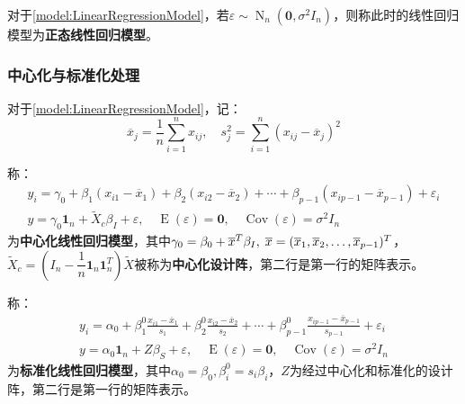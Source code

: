 \begin{definition}\label{model:NormalLinearRegressionModel}
	对于\cref{model:LinearRegressionModel}，若$\varepsilon\sim\operatorname{N}_n(\mathbf{0},\sigma^2I_n)$，则称此时的线性回归模型为\textbf{正态线性回归模型}。
\end{definition}
\subsubsection{中心化与标准化处理}
\begin{definition}\label{model:CentralizedStandardizedLinearModel}
	对于\cref{model:LinearRegressionModel}，记：
	\begin{equation*}
		\overline{x}_j=\frac{1}{n}\sum_{i=1}^{n}x_{ij},\quad s_j^2=\sum_{i=1}^{n}(x_{ij}-\overline{x}_j)^2
	\end{equation*}\par
	称：
	\begin{gather*}
		y_i=\gamma_0+\beta_1(x_{i1}-\overline{x}_1)+\beta_2(x_{i2}-\overline{x}_2)+\cdots+\beta_{p-1}(x_{ip-1}-\overline{x}_{p-1})+\varepsilon_i \\
		y=\gamma_0\mathbf{1}_n+\tilde{X}_c\beta_I+\varepsilon,\quad\operatorname{E}(\varepsilon)=\mathbf{0},\quad\operatorname{Cov}(\varepsilon)=\sigma^2I_n
	\end{gather*}
	为\textbf{中心化线性回归模型}，其中$\gamma_0=\beta_0+\overline{x}^T\beta_I,\;\overline{x}=(\overline{x}_1, \overline{x}_2, \dots, \overline{x}_{p-1})^T$，$\tilde{X}_c=\left(I_n-\dfrac{1}{n}\mathbf{1}_n\mathbf{1}_n^T\right)\tilde{X}$被称为\textbf{中心化设计阵}，第二行是第一行的矩阵表示。\par
	称：
	\begin{gather*}
		y_i=\alpha_0+\beta_1^0\frac{x_{i1}-\overline{x}_1}{s_1}+\beta_2^0\frac{x_{i2}-\overline{x}_2}{s_2}+\cdots+\beta^0_{p-1}\frac{x_{ip-1}-\overline{x}_{p-1}}{s_{p-1}}+\varepsilon_i \\
		y=\alpha_0\mathbf{1}_n+Z\beta_S+\varepsilon,\quad\operatorname{E}(\varepsilon)=\mathbf{0},\quad\operatorname{Cov}(\varepsilon)=\sigma^2I_n
	\end{gather*}
	为\textbf{标准化线性回归模型}，其中$\alpha_0=\beta_0,\beta_i^0=s_i\beta_i$，$Z$为经过中心化和标准化的设计阵，第二行是第一行的矩阵表示。
\end{definition}
